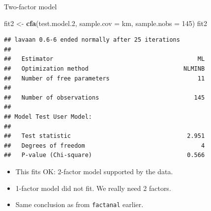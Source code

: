\documentclass[
  ignorenonframetext,
]{beamer}
\newenvironment{Shaded}{\begin{snugshade}}{\end{snugshade}}
\newcommand{\DataTypeTok}[1]{\textcolor[rgb]{0.13,0.29,0.53}{#1}}
\newcommand{\DecValTok}[1]{\textcolor[rgb]{0.00,0.00,0.81}{#1}}
\newcommand{\FloatTok}[1]{\textcolor[rgb]{0.00,0.00,0.81}{#1}}
\newcommand{\KeywordTok}[1]{\textcolor[rgb]{0.13,0.29,0.53}{\textbf{#1}}}
\newcommand{\NormalTok}[1]{#1}
\newcommand{\StringTok}[1]{\textcolor[rgb]{0.31,0.60,0.02}{#1}}
\begin{document}
\begin{frame}[fragile]{Two-factor model}
\protect\hypertarget{two-factor-model}{}

\scriptsize

\begin{Shaded}
\begin{Highlighting}[]
\NormalTok{fit2 <-}\StringTok{ }\KeywordTok{cfa}\NormalTok{(test.model}\FloatTok{.2}\NormalTok{, }\DataTypeTok{sample.cov =}\NormalTok{ km, }\DataTypeTok{sample.nobs =} \DecValTok{145}\NormalTok{)}
\NormalTok{fit2}
\end{Highlighting}
\end{Shaded}

\begin{verbatim}
## lavaan 0.6-6 ended normally after 25 iterations
## 
##   Estimator                                         ML
##   Optimization method                           NLMINB
##   Number of free parameters                         11
##                                                       
##   Number of observations                           145
##                                                       
## Model Test User Model:
##                                                       
##   Test statistic                                 2.951
##   Degrees of freedom                                 4
##   P-value (Chi-square)                           0.566
\end{verbatim}

\normalsize

\begin{itemize}
\item
  This fits OK: 2-factor model supported by the data.
\item
  1-factor model did not fit. We really need 2 factors.
\item
  Same conclusion as from \texttt{factanal} earlier.
\end{itemize}

\end{frame}
\end{document}
